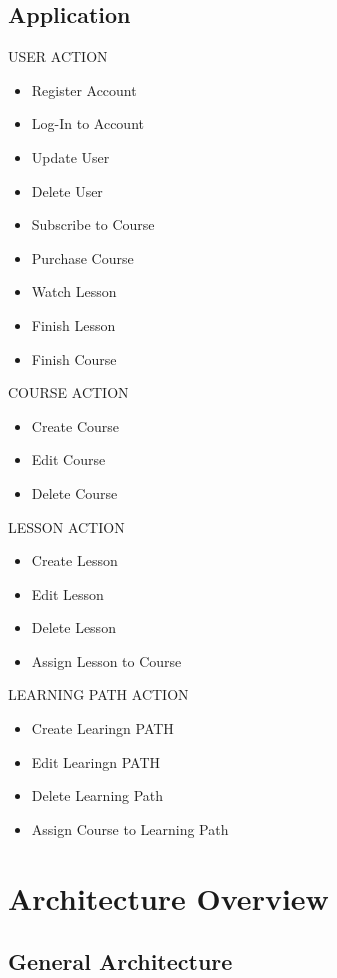 \documentclass{article}
\begin{document}
\subsection[short]{Application}

USER ACTION
\begin{itemize}
    \itemsep 0em 
    \item Register Account 
    \item Log-In to Account
    \item Update User
    \item Delete User
    \item Subscribe to Course
    \item Purchase Course
    \item Watch Lesson
    \item Finish Lesson
    \item Finish Course    
\end{itemize}

COURSE ACTION
\begin{itemize}
    \itemsep 0em 
    \item Create Course
    \item Edit Course
    \item Delete Course
\end{itemize}

LESSON ACTION
\begin{itemize}
    \itemsep 0em 
    \item Create Lesson
    \item Edit Lesson
    \item Delete Lesson
    \item Assign Lesson to Course
\end{itemize}

LEARNING PATH ACTION
\begin{itemize}
    \itemsep 0em 
    \item Create Learingn PATH
    \item Edit Learingn PATH
    \item Delete Learning Path
    \item Assign Course to Learning Path
\end{itemize}


\section{Architecture Overview}
\subsection{General Architecture}
\end{document}
